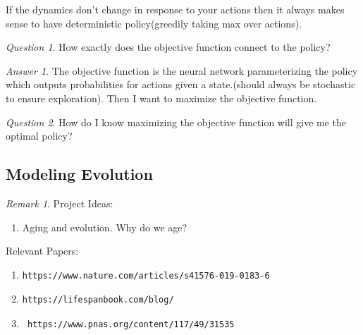 \documentclass[11pt]{article}
\theoremstyle{remark}
\newtheorem{remark}{Remark}
\newtheorem{quest}{Question}
\newtheorem{ans}{Answer}
\begin{document}
If the dynamics don't change in response to your actions then it always makes sense to have deterministic policy(greedily taking max over actions).

\begin{quest}
	How exactly does the objective function connect to the policy?
\end{quest}

\begin{ans}
	The objective function is the neural network parameterizing the policy which outputs probabilities for actions given a state.(should always be stochastic to ensure exploration). Then I want to maximize the objective function. 
\end{ans}

\begin{quest}
	How do I know maximizing the objective function will give me the optimal policy?
\end{quest}

\subsection{Modeling Evolution}

\begin{remark}
	Project Ideas:
	\begin{enumerate}
		\item Aging and evolution. Why do we age?
	\end{enumerate}
	Relevant Papers:
	\begin{enumerate}
		\item \begin{verbatim}https://www.nature.com/articles/s41576-019-0183-6\end{verbatim}
		\item \begin{verbatim}https://lifespanbook.com/blog/
		\end{verbatim}
		\item \begin{verbatim} https://www.pnas.org/content/117/49/31535\end{verbatim}
	\end{enumerate}
\end{remark}
\end{document}
